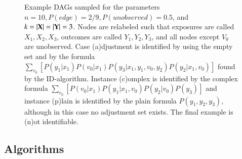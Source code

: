 \begin{figure}
\caption{Example DAGs sampled for the parameters $n = 10,  P(\textit{edge}) = 2/9,  P(\textit{unobserved}) = 0.5$, 
and $k= |{\bf X}|=|{\bf Y}|=3$. 
Nodes are relabeled such that exposures are called 
$X_1,X_2,X_3$, outcomes are called $Y_1,Y_2,Y_3$, and all 
nodes except $V_0$ are unobserved.
Case (a)djustment is identified by using the empty set and by the formula 
$ \sum_{v_{0}}[P(y_{1}\vert x_{1})P(v_{0}\vert x_{1})P(y_{3}\vert x_{1},y_{1},v_{0},y_{2})P(y_{2}\vert x_{1},v_{0})]$ 
found by the ID-algorithm. Instance (c)omplex is identified by the complex formula 
$\sum_{v_{0}}[P(v_{0}\vert x_{1})P(y_{1}\vert x_{1},v_{0})P(y_{2}\vert v_{0})P(y_{3})]$ and 
instance  (p)lain is identified by the plain formula $ P(y_{1},y_{2},y_{3})$, although in this 
case no adjustment set exists.  The final example is (n)ot identifiable.
}\label{fig:experiments:typical:dags}
\end{figure}

\subsection{Algorithms}\label{sec:experiments:algorithms:abbreviations}

